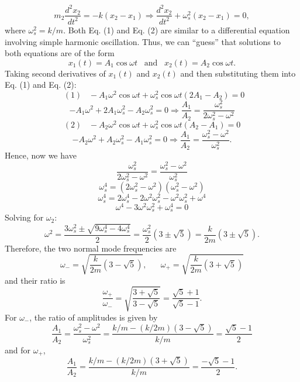 \documentclass[12pt,a4paper]{article}
\begin{document}
\begin{equation}
    m_2\frac{d^2x_2}{dt^2}=-k(x_2-x_1)\Rightarrow\frac{d^2x_2}{dt^2}+\omega_s^2(x_2-x_1)=0,
\end{equation}
where $\omega_s^2=k/m$. Both Eq. (1) and Eq. (2) are similar to a differential equation involving simple harmonic oscillation. Thus, we can “guess” that solutions to both equations are of the form
\[x_1(t)=A_1\cos\omega t\,\,\,\,\,\text{and}\,\,\,\,\,x_2(t)=A_2\cos\omega t.\]
Taking second derivatives of $x_1(t)$ and $x_2(t)$ and then substituting them into Eq. (1) and Eq. (2):
\[\,\,\,(1)\,\,\,\,\,-A_1\omega^2\cos\omega t+\omega_s^2\cos\omega t(2A_1-A_2)=0\]
\begin{equation}
    -A_1\omega^2+2A_1\omega_s^2-A_2\omega_s^2=0\Rightarrow \frac{A_1}{A_2}=\frac{\omega_s^2}{2\omega_s^2-\omega^2}
\end{equation}
\[(2)\,\,\,\,\,-A_2\omega^2\cos\omega t+\omega_s^2\cos\omega t(A_2-A_1)=0\]
\begin{equation}
    -A_2\omega^2+A_2\omega_s^2-A_1\omega_s^2=0\Rightarrow \frac{A_1}{A_2}=\frac{\omega_s^2-\omega^2}{\omega_s^2}.
\end{equation}
Hence, now we have
\[\frac{\omega_s^2}{2\omega_s^2-\omega^2}=\frac{\omega_s^2-\omega^2}{\omega_s^2}\]
\[\omega_s^4=\left(2\omega_s^2-\omega^2\right)\left(\omega_s^2-\omega^2\right)\]
\[\omega_s^4=2\omega_s^4-2\omega^2\omega_s^2-\omega^2\omega_s^2+\omega^4\]
\[\omega^4-3\omega^2\omega_s^2+\omega_s^4=0\]
Solving for $\omega_2$:
\[\omega^2=\frac{3\omega_s^2\pm\sqrt{9\omega_s^4-4\omega_s^4}}{2}=\frac{\omega_s^2}{2}\left(3\pm\sqrt{5}\right)=\frac{k}{2m}\left(3\pm\sqrt{5}\right).\]
Therefore, the two normal mode frequencies are
\begin{equation}
    \omega_-=\sqrt{\frac{k}{2m}\left(3-\sqrt{5}\right)},\,\,\,\,\,\,\,\,\,\,\omega_+=\sqrt{\frac{k}{2m}\left(3+\sqrt{5}\right)}
\end{equation}
and their ratio is
\[\frac{\omega_+}{\omega_-}=\sqrt{\frac{3+\sqrt{5}}{3-\sqrt{5}}}=\frac{\sqrt{5}+1}{\sqrt{5}-1}.\]
For $\omega_-$, the ratio of amplitudes is given by
\[\frac{A_1}{A_2}=\frac{\omega_s^2-\omega^2}{\omega_s^2}=\frac{k/m-(k/2m)\left(3-\sqrt{5}\right)}{k/m}=\frac{\sqrt{5}-1}{2}\]
and for $\omega_+$,
\[\frac{A_1}{A_2}=\frac{k/m-(k/2m)\left(3+\sqrt{5}\right)}{k/m}=\frac{-\sqrt{5}-1}{2}.\]
\\
\end{document}
